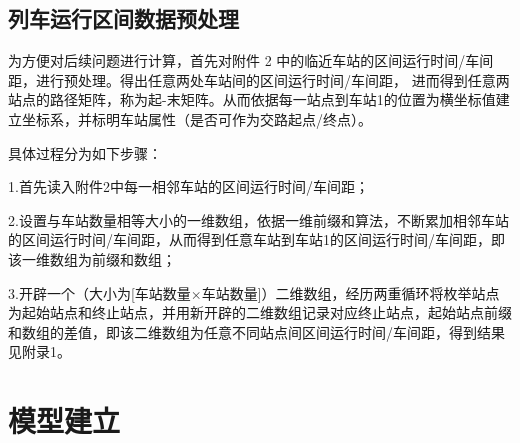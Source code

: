 \documentclass[UTF8]{ctexart}
\begin{document}
\subsection{列车运行区间数据预处理}
为方便对后续问题进行计算，首先对附件 2 中的临近车站的区间运行时间/车间距，进行预处理。得出任意两处车站间的区间运行时间/车间距， 进而得到任意两站点的路径矩阵，称为起-末矩阵。从而依据每一站点到车站1的位置为横坐标值建立坐标系，并标明车站属性（是否可作为交路起点/终点）。\par
具体过程分为如下步骤：\par
1.首先读入附件2中每一相邻车站的区间运行时间/车间距；\par
2.设置与车站数量相等大小的一维数组，依据一维前缀和算法，不断累加相邻车站的区间运行时间/车间距，从而得到任意车站到车站1的区间运行时间/车间距，即该一维数组为前缀和数组；\par
3.开辟一个（大小为[车站数量$\times$车站数量]）二维数组，经历两重循环将枚举站点为起始站点和终止站点，并用新开辟的二维数组记录对应终止站点，起始站点前缀和数组的差值，即该二维数组为任意不同站点间区间运行时间/车间距，得到结果见附录1。\par
\section{模型建立}
\end{document}
